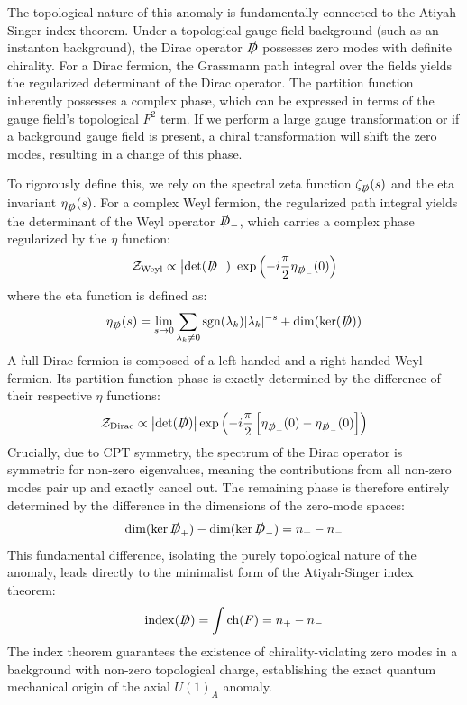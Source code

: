 The topological nature of this anomaly is fundamentally connected to the Atiyah-Singer index theorem. Under a topological gauge field background (such as an instanton background), the Dirac operator $\slashed{D}$ possesses zero modes with definite chirality. For a Dirac fermion, the Grassmann path integral over the fields yields the regularized determinant of the Dirac operator. The partition function inherently possesses a complex phase, which can be expressed in terms of the gauge field's topological $F^2$ term. If we perform a large gauge transformation or if a background gauge field is present, a chiral transformation will shift the zero modes, resulting in a change of this phase.

To rigorously define this, we rely on the spectral zeta function $\zeta_{\slashed{D}}(s)$ and the eta invariant $\eta_{\slashed{D}}(s)$. For a complex Weyl fermion, the regularized path integral yields the determinant of the Weyl operator $\slashed{D}_-$, which carries a complex phase regularized by the $\eta$ function:
\begin{equation}
\mathcal{Z}_{\mathrm{Weyl}} \propto \left| \det(\slashed{D}_-) \right| \exp\left( -i \frac{\pi}{2} \eta_{\slashed{D}_-}(0) \right)
\end{equation}
where the eta function is defined as:
\begin{equation}
\eta_{\slashed{D}}(s) = \lim_{s \to 0} \sum_{\lambda_k \neq 0} \mathrm{sgn}(\lambda_k) |\lambda_k|^{-s} + \dim(\ker(\slashed{D}))
\label{eq:eta_invariant}
\end{equation}
A full Dirac fermion is composed of a left-handed and a right-handed Weyl fermion. Its partition function phase is exactly determined by the difference of their respective $\eta$ functions:
\begin{equation}
\mathcal{Z}_{\mathrm{Dirac}} \propto \left| \det(\slashed{D}) \right| \exp\left( -i \frac{\pi}{2} \left[ \eta_{\slashed{D}_+}(0) - \eta_{\slashed{D}_-}(0) \right] \right)
\end{equation}
Crucially, due to CPT symmetry, the spectrum of the Dirac operator is symmetric for non-zero eigenvalues, meaning the contributions from all non-zero modes pair up and exactly cancel out. The remaining phase is therefore entirely determined by the difference in the dimensions of the zero-mode spaces:
\begin{equation}
\dim(\ker \slashed{D}_+) - \dim(\ker \slashed{D}_-) = n_+ - n_-
\end{equation}
This fundamental difference, isolating the purely topological nature of the anomaly, leads directly to the minimalist form of the Atiyah-Singer index theorem:
\begin{equation}
\mathrm{index}(\slashed{D}) = \int \mathrm{ch}(F) = n_+ - n_-
\end{equation}
The index theorem guarantees the existence of chirality-violating zero modes in a background with non-zero topological charge, establishing the exact quantum mechanical origin of the axial $U(1)_A$ anomaly.

